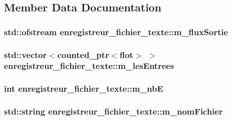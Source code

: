 \subsection{Member Data Documentation}
\hypertarget{classenregistreur__fichier__texte_a60a1e2e5f42a546b5065eec67720e368}{
\subsubsection[{m\-\_\-flux\-Sortie}]{\setlength{\rightskip}{0pt plus 5cm}std\-::ofstream enregistreur\-\_\-fichier\-\_\-texte\-::m\-\_\-flux\-Sortie\hspace{0.3cm}{\ttfamily [private]}}}\label{classenregistreur__fichier__texte_a60a1e2e5f42a546b5065eec67720e368}
\hypertarget{classenregistreur__fichier__texte_ae14bdd7eedf13e9035b72605604149c0}{
\subsubsection[{m\-\_\-les\-Entrees}]{\setlength{\rightskip}{0pt plus 5cm}std\-::vector$<${\bf counted\-\_\-ptr}$<${\bf flot}$>$ $>$ enregistreur\-\_\-fichier\-\_\-texte\-::m\-\_\-les\-Entrees\hspace{0.3cm}{\ttfamily [private]}}}\label{classenregistreur__fichier__texte_ae14bdd7eedf13e9035b72605604149c0}
\hypertarget{classenregistreur__fichier__texte_a8cf1798b552aafaeaf2f163af64334e4}{
\subsubsection[{m\-\_\-nb\-E}]{\setlength{\rightskip}{0pt plus 5cm}int enregistreur\-\_\-fichier\-\_\-texte\-::m\-\_\-nb\-E\hspace{0.3cm}{\ttfamily [private]}}}\label{classenregistreur__fichier__texte_a8cf1798b552aafaeaf2f163af64334e4}
\hypertarget{classenregistreur__fichier__texte_a5cb161484890a18dd4130f59b13c0494}{
\subsubsection[{m\-\_\-nom\-Fichier}]{\setlength{\rightskip}{0pt plus 5cm}std\-::string enregistreur\-\_\-fichier\-\_\-texte\-::m\-\_\-nom\-Fichier\hspace{0.3cm}{\ttfamily [private]}}}\label{classenregistreur__fichier__texte_a5cb161484890a18dd4130f59b13c0494}


